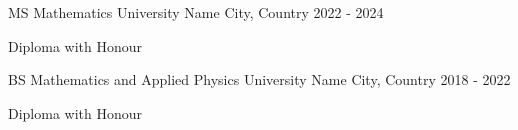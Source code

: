 

\begin{cventries}


  \cventry
    {MS Mathematics } %
    { University Name} %
    {City, Country} %
    {2022 - 2024} %
    {
      \begin{cvitems} %
        \item {Diploma with Honour}
      \end{cvitems}
    }

  \cventry
    {BS Mathematics and Applied Physics} %
    {University Name} %
    {City, Country} %
    {2018 - 2022} %
    {
      \begin{cvitems} %
        \item {Diploma with Honour }
      \end{cvitems}
    }

\end{cventries}
